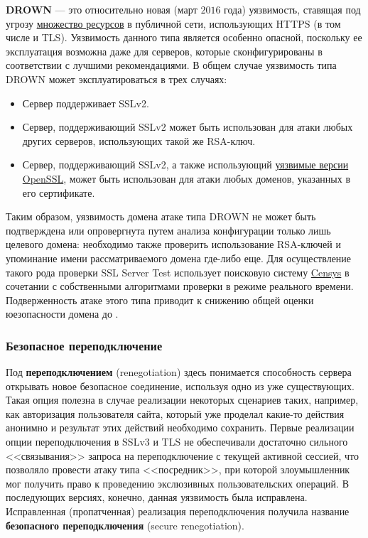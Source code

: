 \textbf{DROWN} --- это относительно новая (март $2016$ года) уязвимость, ставящая под угрозу 
\href{https://drownattack.com/top-sites.html}{множество ресурсов} в публичной сети, использующих HTTPS (в том числе и TLS). 
Уязвимость данного типа является особенно опасной, поскольку ее эксплуатация возможна даже для серверов, которые сконфигурированы в 
соответствии с лучшими рекомендациями. В общем случае уязвимость типа DROWN может эксплуатироваться в трех случаях:
\begin{itemize}
    \item Сервер поддерживает SSLv2. 
    \item Сервер, поддерживающий SSLv2 может быть использован для атаки любых других серверов, использующих такой же RSA-ключ.
    \item Сервер, поддерживающий SSLv2, а также использующий \href{https://www.openssl.org/news/secadv/20160301.txt}{уязвимые 
        версии OpenSSL}, может быть использован для атаки любых доменов, указанных в его сертификате.
\end{itemize}
Таким образом, уязвимость домена атаке типа DROWN не может быть подтверждена или опровергнута путем анализа конфигурации только лишь 
целевого домена: необходимо также проверить использование RSA-ключей и упоминание имени рассматриваемого домена где-либо еще. Для 
осуществление такого рода проверки SSL Server Test использует поисковую систему \href{https://censys.io/}{Censys} в сочетании с 
собственными алгоритмами проверки в режиме реального времени. Подверженность атаке этого типа приводит к снижению общей оценки 
юезопасности домена до . 

\subsubsection{Безопасное переподключение}

Под \textbf{переподключением} (renegotiation) здесь понимается способность сервера открывать новое безопасное соединение, используя 
одно из уже существующих. Такая опция полезна в случае реализации некоторых сценариев таких, например, как авторизация пользователя 
сайта, который уже проделал какие-то действия анонимно и результат этих действий необходимо сохранить. Первые реализации опции 
переподключения в SSLv3 и TLS не обеспечивали достаточно сильного <<связывания>> запроса на переподключение с текущей активной 
сессией, что позволяло провести атаку типа <<посредник>>, при которой злоумышленник мог получить право к проведению экслюзивных 
пользовательских операций. В последующих версиях, конечно, данная уязвимость была исправлена. Исправленная (пропатченная) реализация
переподключения получила название \textbf{безопасного переподключения} (secure renegotiation).

